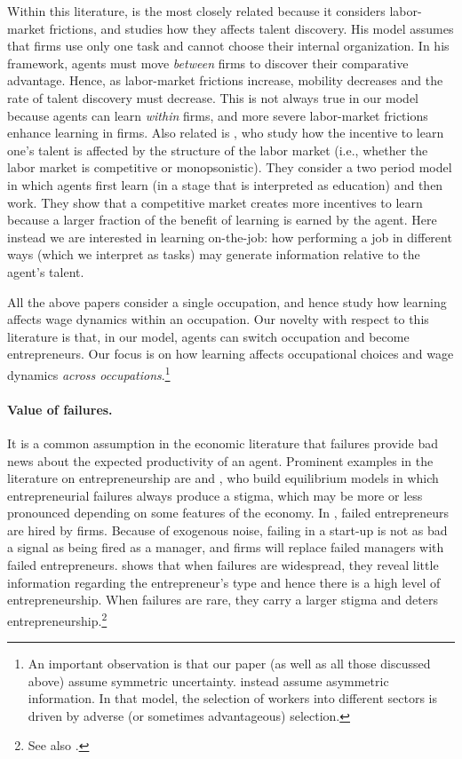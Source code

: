 \documentclass[12pt,american]{paper}
\theoremstyle{remark}
\begin{document}
Within this literature, \citet*{papageorgiou_learning_2010} is the most closely related because it considers labor-market frictions, and studies how they affects talent discovery. His model assumes that firms use only one task and cannot choose their internal organization. In his framework, agents must move \textit{between} firms to discover their comparative advantage. Hence, as labor-market frictions increase, mobility decreases and the rate of talent discovery must decrease. This is not always true in our model because agents can learn \textit{within} firms, and more severe labor-market frictions enhance learning in firms. Also related is \cite*{Bruenner2019}, who study how the  incentive to learn one's talent is affected by the structure of the labor market (i.e., whether the labor market is competitive or monopsonistic). They consider a two period model in which agents first learn (in a stage that is interpreted as education) and then work. They show that a competitive market creates more incentives to learn because a larger fraction of the benefit of learning is earned by the agent. Here instead we are interested in learning on-the-job: how performing a job in different ways (which we interpret as tasks) may generate information relative to the agent's talent.

All the above papers consider a single occupation, and hence study how learning affects wage dynamics within an occupation. Our novelty with respect to this literature is that, in our model, agents can switch occupation and become entrepreneurs. Our focus is on how learning affects occupational choices and wage dynamics \textit{across occupations}.\footnote{An important observation is that our paper (as well as all those discussed above) assume symmetric uncertainty. \cite{Bar-Isaac2020} instead assume asymmetric information. In that model, the selection of workers into different sectors is driven by adverse (or sometimes advantageous) selection. }

\paragraph{Value of failures.}
It is a common assumption in the economic literature that failures provide bad news about the expected productivity of an agent. Prominent examples in the literature on entrepreneurship are \citet{gromb_entrepreneurship_2002} and \citet{landier_entrepreneurship_2005}, who build equilibrium models in which entrepreneurial failures always produce a stigma, which may be more or less pronounced depending on some features of the economy.
In \citet*{gromb_entrepreneurship_2002}, failed entrepreneurs are hired by firms. Because of exogenous noise, failing in a start-up is not as bad a signal as being fired as a manager, and firms will replace failed managers with failed entrepreneurs. \citet{landier_entrepreneurship_2005} shows that when failures are widespread, they reveal little information regarding the entrepreneur's type and hence there is a high level of entrepreneurship. When failures are rare, they carry a larger stigma and deters entrepreneurship.\footnote{See also \citet*{schumacher2015entrepreneurial}.}
\end{document}
